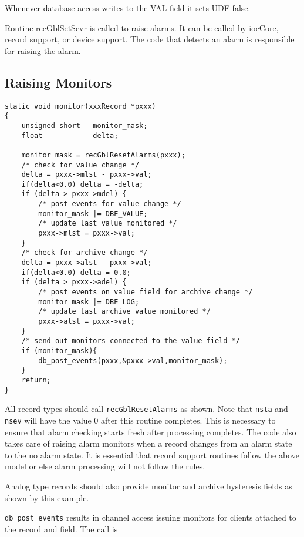 Whenever database access writes to the VAL field it sets UDF false.

Routine recGblSetSevr is called to raise alarms. It can be called by iocCore, record support, or device support. The code 
that detects an alarm is responsible for raising the alarm.

\subsection{Raising Monitors}

\begin{verbatim}
static void monitor(xxxRecord *pxxx)
{
    unsigned short   monitor_mask;
    float            delta;

    monitor_mask = recGblResetAlarms(pxxx);
    /* check for value change */
    delta = pxxx->mlst - pxxx->val;
    if(delta<0.0) delta = -delta;
    if (delta > pxxx->mdel) {
        /* post events for value change */
        monitor_mask |= DBE_VALUE;
        /* update last value monitored */
        pxxx->mlst = pxxx->val;
    }
    /* check for archive change */
    delta = pxxx->alst - pxxx->val;
    if(delta<0.0) delta = 0.0;
    if (delta > pxxx->adel) {
        /* post events on value field for archive change */
        monitor_mask |= DBE_LOG;
        /* update last archive value monitored */
        pxxx->alst = pxxx->val;
    }
    /* send out monitors connected to the value field */
    if (monitor_mask){
        db_post_events(pxxx,&pxxx->val,monitor_mask);
    }
    return;
}
\end{verbatim}

All record types should call \verb|recGblResetAlarms| as shown. Note that \verb|nsta| and \verb|nsev| will have the value 0 after this 
routine completes. This is necessary to ensure that alarm checking starts fresh after processing completes. The code also 
takes care of raising alarm monitors when a record changes from an alarm state to the no alarm state. It is essential that 
record support routines follow the above model or else alarm processing will not follow the rules.

Analog type records should also provide monitor and archive hysteresis fields as shown by this example.

\verb|db_post_events| results in channel access issuing monitors for clients attached to the record and field. The call is

